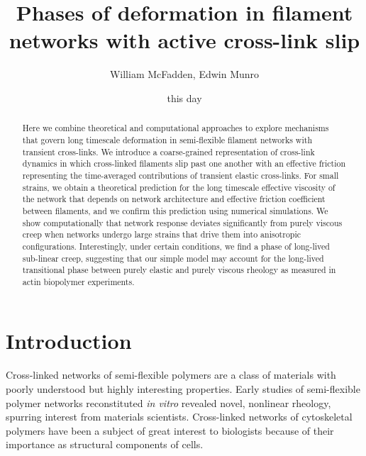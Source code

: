 \documentclass[pre,preprint]{revtex4-1}
\begin{document}
\title{Phases of deformation in filament networks with active cross-link slip}
\author{William McFadden, Edwin Munro}

\date{this day}


\begin{abstract}
Here we combine theoretical and computational approaches to explore mechanisms that govern  long timescale deformation in semi-flexible filament networks with transient cross-links.  We introduce a coarse-grained representation of cross-link dynamics in which cross-linked filaments slip past one another with an effective friction representing the time-averaged contributions of transient elastic cross-links.  For small strains, we obtain a theoretical prediction for the long timescale effective viscosity of the network that depends on network architecture and effective friction coefficient between filaments, and we confirm this prediction using numerical simulations.  We show computationally that network response deviates significantly from purely viscous creep when networks undergo large strains that drive them into anisotropic configurations.  Interestingly, under certain conditions, we find a phase of long-lived sub-linear creep, suggesting that our simple model may account for the long-lived transitional phase between purely elastic and purely viscous rheology as measured in actin biopolymer experiments.  
\end{abstract}



\maketitle


\tableofcontents


















\section{Introduction}

Cross-linked networks of semi-flexible polymers are a class of materials with poorly understood but highly interesting properties.    Early studies of semi-flexible polymer networks reconstituted {\em in vitro} revealed novel, nonlinear rheology, spurring interest from materials scientists\cite{megareview}.  Cross-linked networks of cytoskeletal polymers have been a subject of great interest to biologists  because of their importance as structural components of cells\cite{cellmech_review1,cellmech_review2}.
\end{document}

